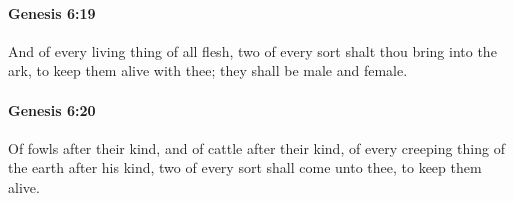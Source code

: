 		\paragraph{Genesis 6:19} %
			\label{GENESIS-6-19}

			And of every living thing of all flesh, two of every sort shalt thou bring into the ark, to keep them alive with thee; they shall be male and female.


		\paragraph{Genesis 6:20} %
			\label{GENESIS-6-20}

			Of fowls after their kind, and of cattle after their kind, of every creeping thing of the earth after his kind, two of every sort shall come unto thee, to keep them alive.


